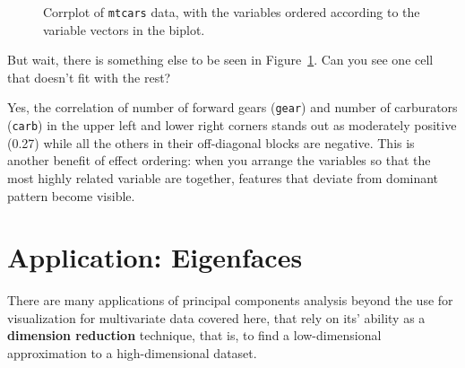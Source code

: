 \documentclass[
  letterpaper,
  10pt,
  krantz2]{krantz}
\begin{document}
\begin{figure}[H]


\caption{\label{fig-mtcars-corrplot-pcaorder}Corrplot of \texttt{mtcars}
data, with the variables ordered according to the variable vectors in
the biplot.}

\end{figure}%

But wait, there is something else to be seen in
Figure~\ref{fig-mtcars-corrplot-pcaorder}. Can you see one cell that
doesn't fit with the rest?

Yes, the correlation of number of forward gears (\texttt{gear}) and
number of carburators (\texttt{carb}) in the upper left and lower right
corners stands out as moderately positive (0.27) while all the others in
their off-diagonal blocks are negative. This is another benefit of
effect ordering: when you arrange the variables so that the most highly
related variable are together, features that deviate from dominant
pattern become visible.

\section{Application: Eigenfaces}\label{application-eigenfaces}

There are many applications of principal components analysis beyond the
use for visualization for multivariate data covered here, that rely on
its' ability as a \textbf{dimension reduction} technique, that is, to
find a low-dimensional approximation to a high-dimensional dataset.
\end{document}
